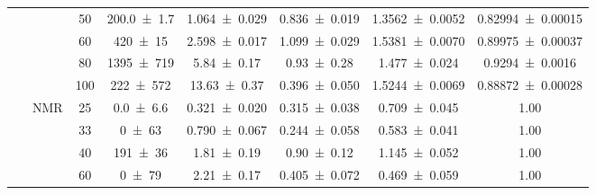 \begin{table}[!ht]
\begin{tabular}{c|cc ccccc}
        ~ & ~ & 50 & \num{200.0 \pm 1.7} & \num{1.064 \pm 0.029} & \num{0.836 \pm 0.019} & \num{1.3562 \pm 0.0052} & \num{0.82994 \pm 0.00015} \\
        ~ & ~ & 60 & \num{420 \pm 15} & \num{2.598 \pm 0.017} & \num{1.099 \pm 0.029} & \num{1.5381 \pm 0.0070} & \num{0.89975 \pm 0.00037} \\
        ~ & ~ & 80 & \num{1395 \pm 719} & \num{5.84 \pm 0.17} & \num{0.93 \pm 0.28} & \num{1.477 \pm 0.024} & \num{0.9294 \pm 0.0016} \\
        ~ & ~ & 100 & \num{222 \pm 572} & \num{13.63 \pm 0.37} & \num{0.396 \pm 0.050} & \num{1.5244 \pm 0.0069} & \num{0.88872 \pm 0.00028} \\
        \cline{2-8}
        ~ & \multirow{4}{*}{NMR} & 25 & \num{0.0 \pm 6.6} & \num{0.321 \pm 0.020} & \num{0.315 \pm 0.038} & \num{0.709 \pm 0.045} & 1.00 \\
        ~ & ~ & 33 & \num{0 \pm 63} & \num{0.790 \pm 0.067} & \num{0.244 \pm 0.058} & \num{0.583 \pm 0.041} & 1.00 \\
        ~ & ~ & 40 & \num{191 \pm 36} & \num{1.81 \pm 0.19} & \num{0.90 \pm 0.12} & \num{1.145 \pm 0.052} & 1.00 \\
        ~ & ~ & 60 & \num{0 \pm 79} & \num{2.21 \pm 0.17} & \num{0.405 \pm 0.072} & \num{0.469 \pm 0.059} & 1.00 \\
    \end{tabular}
\end{table}
